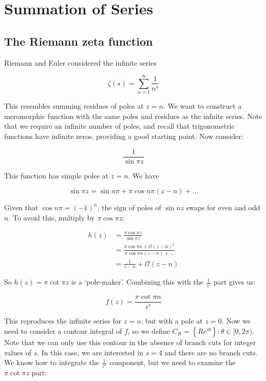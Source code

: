\documentclass{physics_notes}
\begin{document}
\section{Summation of Series}

\subsection{The Riemann zeta function}

Riemann and Euler considered the infinite series

\begin{equation}\label{eq:riemann_zeta}
\zeta(s) = \sum_{n=1}^\infty \frac{1}{n^s}
\end{equation}

This resembles summing residues of poles at $z=n$. We want to construct a meromorphic function with the same poles and residues as the infnite series. Note that we require an infinite number of poles, and recall that trigonometric functions have infinite zeros, providing a good starting point. Now consider:

\[ \frac{1}{\sin{\pi z}} \]

This function has simple poles at $z=n$. We have 

\[ \sin{\pi z} = \sin{n\pi} + \pi\cos{n\pi}(z-n) + ... \]

Given that $\cos{n\pi} = (-1)^n$, the sign of poles of $\sin{nz}$ swaps for even and odd $n$. To avoid this, multiply by $\pi \cos{\pi z}$:

\begin{align*}
h(z) &= \frac{\pi\cos{\pi z}}{\sin{\pi z}} \\
&= \frac{\pi\cos{\pi n} + \mathcal{O}(z-n)^2}{\pi\cos{\pi n} (z-n) + \dots} \\
&= \frac{1}{z-n} + \mathcal{O}(z-n)
\end{align*}

So $h(z) = \pi\cot{\pi z}$ is a `pole-maker'. Combining this with the $\frac{1}{z^s}$ part gives us:

\[ f(z) = \frac{\pi\cot{\pi n}}{z^s} \]

This reproduces the infinite series for $z = n$, but with a pole at $z=0$. Now we need to consider a contour integral of $f$, so we define $C_R = \left\{Re^{i\theta}\right\}: \theta \in [0,2\pi)$. Note that we can only use this contour in the absence of branch cuts for integer values of $s$. In this case, we are interested in $s=4$ and there are no branch cuts. We know how to integrate the $\frac{1}{z^s}$ component, but we need to examine the $\pi\cot{\pi z}$ part:
\end{document}
